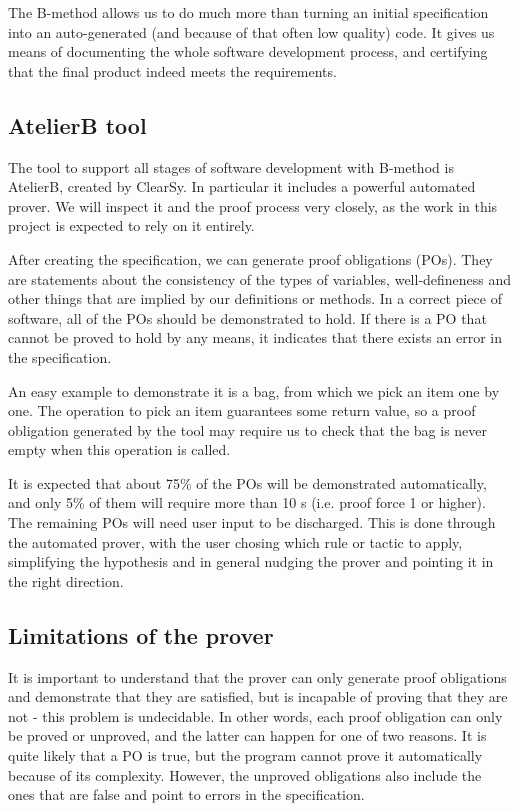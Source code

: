 \documentclass[11pt,journal]{IEEEtran}
\begin{document}
	The B-method allows us to do much more than turning an initial specification into an auto-generated (and because of that often low quality) code. It gives us means of documenting the whole software development process, and certifying that the final product indeed meets the requirements.
	
	\subsection{AtelierB tool}
	The tool to support all stages of software development with B-method is AtelierB, created by ClearSy. In particular it includes a powerful automated prover. We will inspect it and the proof process very closely, as the work in this project is expected to rely on it entirely.
	
	After creating the specification, we can generate proof obligations (POs). They are statements about the consistency of the types of variables, well-defineness and other things that are implied by our definitions or methods. In a correct piece of software, all of the POs should be demonstrated to hold. If there is a PO that cannot be proved to hold by any means, it indicates that there exists an error in the specification.
	
	An easy example to demonstrate it is a bag, from which we pick an item one by one. The operation to pick an item guarantees some return value, so a proof obligation generated by the tool may require us to check that the bag is never empty when this operation is called.
	
	It is expected that about 75\% of the POs will be demonstrated automatically, and only 5\% of them will require more than 10 s (i.e. proof force 1 or higher)\cite{Prover guide}. The remaining POs will need user input to be discharged. This is done through the automated prover, with the user chosing which rule or tactic to apply, simplifying the hypothesis and in general nudging the prover and pointing it in the right direction.
	
	
	\subsection{Limitations of the prover}
	It is important to understand that the prover can only generate proof obligations and demonstrate that they are satisfied, but is incapable of proving that they are not - this problem is undecidable. In other words, each proof obligation can only be proved or unproved, and the latter can happen for one of two reasons. It is quite likely that a PO is true, but the program cannot prove it automatically because of its complexity. However, the unproved obligations also include the ones that are false and point to errors in the specification. 
	
\end{document}
